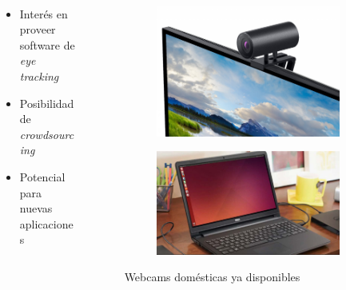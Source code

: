 \documentclass[aspectratio=169]{beamer}
\begin{document}
\begin{frame}{~}

  \begin{columns}
    \begin{column}{0.4\textwidth}
      \begin{itemize}
        \item Interés en proveer software de \textit{eye tracking}

        \item Posibilidad de \textit{crowdsourcing}

        \item Potencial para nuevas aplicaciones
      \end{itemize}

    \end{column}
    \begin{column}{0.6\textwidth}

      \begin{figure}
        \begin{subfigure}{0.49\textwidth}
          \centering
          \includegraphics[width=0.8\linewidth]{img/external-webcam.jpg}
        \end{subfigure}
        \begin{subfigure}{0.49\textwidth}
          \centering
          \includegraphics[width=0.8\linewidth]{img/notebook.jpg}
        \end{subfigure}
        \caption{Webcams domésticas ya disponibles}
      \end{figure}


\end{column}
\end{columns}
\end{frame}
\end{document}
